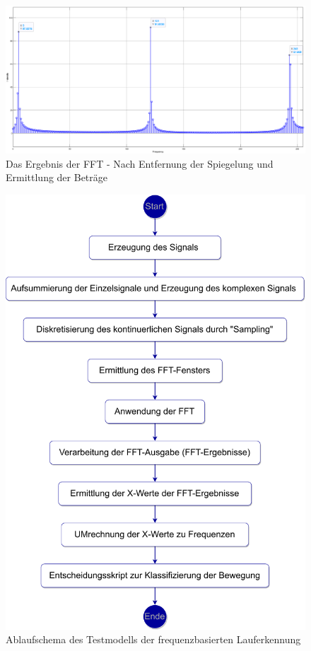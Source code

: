 \begin{figure}
	\centering 
	\includegraphics[width=\linewidth]{Bilder/FFT_Ergebnis_Skala_512.png} %
	\caption{Das Ergebnis der FFT - Nach Entfernung der Spiegelung und Ermittlung der Beträge}
	\label{fig:FFT_Ergebnis_Skala_512}
\end{figure}

\begin{figure}
	\centering
	\includegraphics[width=0.7\linewidth]{Bilder/Frequenzermittlung_Ablaufschema_pdf.pdf}
	\caption{Ablaufschema des Testmodells der frequenzbasierten Lauferkennung}
	\label{fig:Lauferkennung_FFT_Ablaufschema_Testmodell}
\end{figure}

